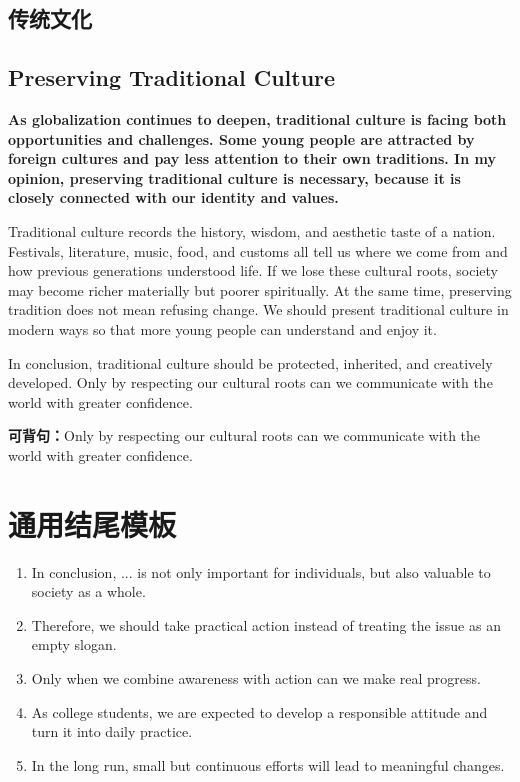 ﻿\documentclass[UTF8,zihao=-4]{ctexart}
\newenvironment{essayblock}{\Needspace{0.46\textheight}\begin{samepage}}{\end{samepage}\vspace{0.2em}}
\newcommand{\essay}[3]{\section{#1}\subsection{#2}\textbf{#3}\par}
\newcommand{\keysentence}[1]{\begin{sentbox}\textbf{可背句：}#1\end{sentbox}}
\begin{document}
\begin{essayblock}
\essay{传统文化}{Preserving Traditional Culture}{As globalization continues to deepen, traditional culture is facing both opportunities and challenges. Some young people are attracted by foreign cultures and pay less attention to their own traditions. In my opinion, preserving traditional culture is necessary, because it is closely connected with our identity and values.}

Traditional culture records the history, wisdom, and aesthetic taste of a nation. Festivals, literature, music, food, and customs all tell us where we come from and how previous generations understood life. If we lose these cultural roots, society may become richer materially but poorer spiritually. At the same time, preserving tradition does not mean refusing change. We should present traditional culture in modern ways so that more young people can understand and enjoy it.

In conclusion, traditional culture should be protected, inherited, and creatively developed. Only by respecting our cultural roots can we communicate with the world with greater confidence.

\keysentence{Only by respecting our cultural roots can we communicate with the world with greater confidence.}
\end{essayblock}

\section{通用结尾模板}
\begin{templatebox}
\begin{enumerate}
  \item In conclusion, ... is not only important for individuals, but also valuable to society as a whole.
  \item Therefore, we should take practical action instead of treating the issue as an empty slogan.
  \item Only when we combine awareness with action can we make real progress.
  \item As college students, we are expected to develop a responsible attitude and turn it into daily practice.
  \item In the long run, small but continuous efforts will lead to meaningful changes.
\end{enumerate}
\end{templatebox}
\end{document}
